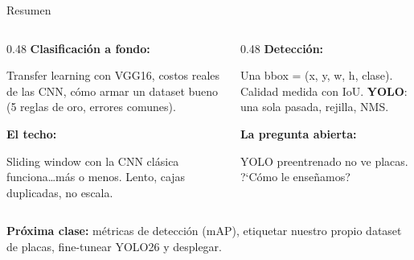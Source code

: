 \documentclass[aspectratio=169, 11pt]{beamer}
\begin{document}
\begin{frame}[shrink]{Resumen}
  \vspace{6pt}
  \begin{columns}[T]
    \begin{column}{0.48\textwidth}
      {\footnotesize\bfseries\color{arcaDark} Clasificaci\'on a fondo:}
      \vspace{4pt}

      {\scriptsize
      Transfer learning con VGG16, costos reales de las CNN, c\'omo
      armar un dataset bueno (5 reglas de oro, errores comunes).

      \vspace{8pt}
      \textbf{El techo:}

      \vspace{4pt}
      Sliding window con la CNN cl\'asica funciona\ldots m\'as o menos.
      Lento, cajas duplicadas, no escala.
      }
    \end{column}
    \begin{column}{0.48\textwidth}
      {\footnotesize\bfseries\color{arcaDark} Detecci\'on:}
      \vspace{4pt}

      {\scriptsize
      Una bbox = (x, y, w, h, clase). Calidad medida con IoU.
      \textbf{YOLO}: una sola pasada, rejilla, NMS.

      \vspace{8pt}
      \textbf{La pregunta abierta:}

      \vspace{4pt}
      YOLO preentrenado no ve placas. ?`C\'omo le ense\~namos?
      }
    \end{column}
  \end{columns}

  \vspace{12pt}
  \begin{tcolorbox}[colback=codeGreen!8, colframe=codeGreen, boxrule=0.5pt,
    arc=2pt, left=6pt, right=6pt, top=4pt, bottom=4pt]
    {\scriptsize\color{arcaDark}
    \faKey\hspace{4pt}\textbf{Pr\'oxima clase:} m\'etricas de detecci\'on
    (mAP), etiquetar nuestro propio dataset de placas, fine-tunear
    YOLO26 y desplegar.}
  \end{tcolorbox}
\end{frame}
\end{document}
